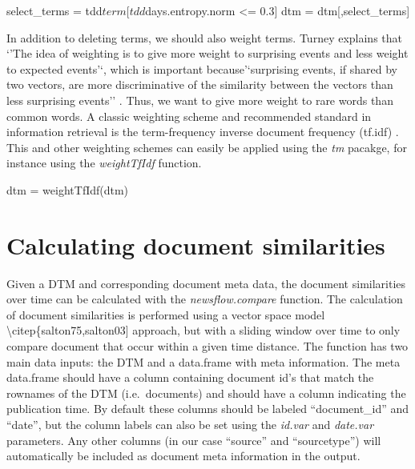\begin{Schunk}
\begin{Sinput}
select_terms = tdd$term[tdd$days.entropy.norm <= 0.3]
dtm = dtm[,select_terms]
\end{Sinput}
\end{Schunk}

In addition to deleting terms, we should also weight terms. Turney
explains that `'The idea of weighting is to give more weight to
surprising events and less weight to expected events'`, which is
important because'`surprising events, if shared by two vectors, are more
discriminative of the similarity between the vectors than less
surprising events'' \citep[156]{turney02}. Thus, we want to give more
weight to rare words than common words. A classic weighting scheme and
recommended standard in information retrieval is the term-frequency
inverse document frequency (tf.idf) \citep{sparck72,monroe08}. This and
other weighting schemes can easily be applied using the \emph{tm}
pacakge, for instance using the \emph{weightTfIdf} function.

\begin{Schunk}
\begin{Sinput}
dtm = weightTfIdf(dtm)
\end{Sinput}
\end{Schunk}

\section{Calculating document similarities}

Given a DTM and corresponding document meta data, the document
similarities over time can be calculated with the
\emph{newsflow.compare} function. The calculation of document
similarities is performed using a vector space model
\textbackslash{}citep\{salton75,salton03{]} approach, but with a sliding
window over time to only compare document that occur within a given time
distance. The function has two main data inputs: the DTM and a
data.frame with meta information. The meta data.frame should have a
column containing document id's that match the rownames of the DTM
(i.e.~documents) and should have a column indicating the publication
time. By default these columns should be labeled ``document\_id'' and
``date'', but the column labels can also be set using the \emph{id.var}
and \emph{date.var} parameters. Any other columns (in our case
``source'' and ``sourcetype'') will automatically be included as
document meta information in the output.

